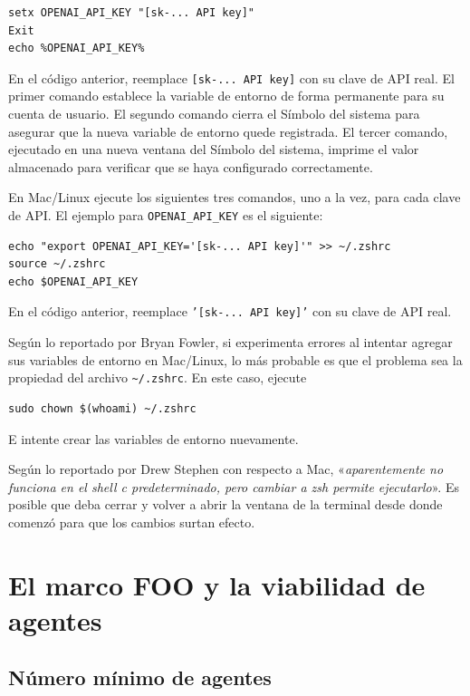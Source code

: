 \begin{verbatim}
setx OPENAI_API_KEY "[sk-... API key]"
Exit
echo %OPENAI_API_KEY%
\end{verbatim}

En el código anterior, reemplace \texttt{[sk-... API key]} con su clave de API real. El primer comando establece la variable de entorno de forma permanente para su cuenta de usuario. El segundo comando cierra el Símbolo del sistema para asegurar que la nueva variable de entorno quede registrada. El tercer comando, ejecutado en una nueva ventana del Símbolo del sistema, imprime el valor almacenado para verificar que se haya configurado correctamente.

\vs

En Mac/Linux ejecute los siguientes tres comandos, uno a la vez, para cada clave de API. El ejemplo para \texttt{OPENAI\_API\_KEY} es el siguiente:

\begin{verbatim}
echo "export OPENAI_API_KEY='[sk-... API key]'" >> ~/.zshrc
source ~/.zshrc
echo $OPENAI_API_KEY
\end{verbatim}

En el código anterior, reemplace \texttt{'[sk-... API key]'} con su clave de API real.

\vs

Según lo reportado por Bryan Fowler, si experimenta errores al intentar agregar sus variables de entorno en Mac/Linux, lo más probable es que el problema sea la propiedad del archivo \texttt{\~{}/.zshrc}. En este caso, ejecute

\begin{verbatim}
sudo chown $(whoami) ~/.zshrc
\end{verbatim}

E intente crear las variables de entorno nuevamente.

\vs

Según lo reportado por Drew Stephen con respecto a Mac, «\textit{aparentemente no funciona en el shell c predeterminado, pero cambiar a zsh permite ejecutarlo}». Es posible que deba cerrar y volver a abrir la ventana de la terminal desde donde comenzó para que los cambios surtan efecto.

\section{El marco FOO y la viabilidad de agentes}
\label{sec:foo}

\subsection{Número mínimo de agentes}

